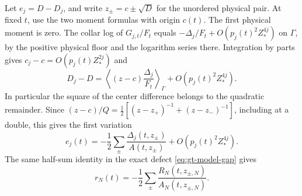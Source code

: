 Let \(e_j=D-D_j\), and write \(z_\pm=c\pm\sqrt D\) for the
unordered physical pair. At fixed \(t\), use the two moment
formulas with origin \(c(t)\). The first physical moment is zero.
The collar log of \(G_{j,t}/F_t\) equals
\(-\Delta_j/F_t+O(p_j(t)^2 Z_*^{4j})\) on \(\Gamma\), by the
positive physical floor and the logarithm series there. Integration
by parts gives \(c_j-c=O(p_j(t)Z_*^{2j})\) and
\[
 D_j-D=\left\langle (z-c)\frac{\Delta_j}{F_t}\right\rangle_\Gamma
               +O(p_j(t)^2Z_*^{4j}).
\]
In particular the square of the center difference belongs to the
quadratic remainder. Since
\((z-c)/Q=\tfrac12[(z-z_+)^{-1}+(z-z_-)^{-1}]\), including at a
double, this gives the first variation
\begin{equation}
 e_j(t)=-\frac12\sum_\pm\frac{\Delta_j(t,z_\pm)}{A(t,z_\pm)}
               +O(p_j(t)^2Z_*^{4j}).
 \label{eq:gt-gap-first-variation}
\end{equation}
The same half-sum identity in the exact defect
\eqref{eq:gt-model-gap} gives
\begin{equation}
 r_N(t)=-\frac12\sum_\pm\frac{R_N(t,z_{\pm,N})}{A_N(t,z_{\pm,N})}.
 \label{eq:gt-root-average-defect}
\end{equation}

